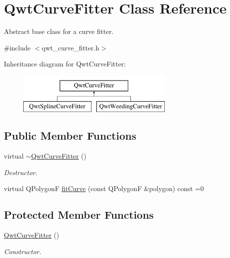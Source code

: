 \hypertarget{class_qwt_curve_fitter}{\section{Qwt\-Curve\-Fitter Class Reference}
\label{class_qwt_curve_fitter}
}


Abstract base class for a curve fitter.  




{\ttfamily \#include $<$qwt\-\_\-curve\-\_\-fitter.\-h$>$}

Inheritance diagram for Qwt\-Curve\-Fitter\-:\begin{figure}[H]
\begin{center}
\leavevmode
\includegraphics[height=2.000000cm]{class_qwt_curve_fitter}
\end{center}
\end{figure}
\subsection*{Public Member Functions}
\begin{DoxyCompactItemize}
\item 
virtual \hyperlink{class_qwt_curve_fitter_a62919f309f0441d94adea94573d0f778}{$\sim$\-Qwt\-Curve\-Fitter} ()
\begin{DoxyCompactList}\small\item\em Destructor. \end{DoxyCompactList}\item 
virtual Q\-Polygon\-F \hyperlink{class_qwt_curve_fitter_afa9bf5b328aa553229e204533a60fec0}{fit\-Curve} (const Q\-Polygon\-F \&polygon) const =0
\end{DoxyCompactItemize}
\subsection*{Protected Member Functions}
\begin{DoxyCompactItemize}
\item 
\hyperlink{class_qwt_curve_fitter_ad804660017ae0f3ede604470724b3df3}{Qwt\-Curve\-Fitter} ()
\begin{DoxyCompactList}\small\item\em Constructor. \end{DoxyCompactList}\end{DoxyCompactItemize}



